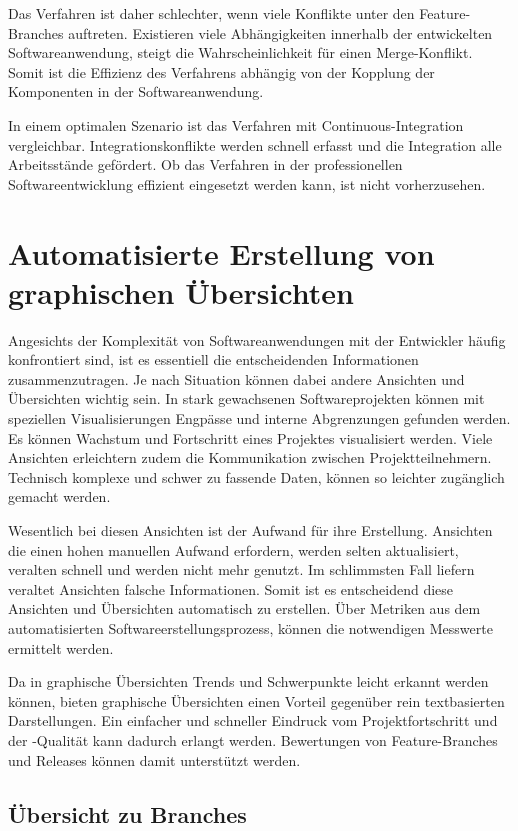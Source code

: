 Das Verfahren ist daher schlechter, wenn viele Konflikte unter den Feature-Branches auftreten. Existieren viele Abhängigkeiten innerhalb der entwickelten Softwareanwendung, steigt die Wahrscheinlichkeit für einen Merge-Konflikt. Somit ist die Effizienz des Verfahrens abhängig von der Kopplung der Komponenten in der Softwareanwendung.

In einem optimalen Szenario ist das Verfahren mit Continuous-Integration vergleichbar. Integrationskonflikte werden schnell erfasst und die Integration alle Arbeitsstände gefördert. Ob das Verfahren in der professionellen Softwareentwicklung effizient eingesetzt werden kann, ist nicht vorherzusehen.

\section{Automatisierte Erstellung von graphischen Übersichten}

Angesichts der Komplexität von Softwareanwendungen mit der Entwickler häufig konfrontiert sind, ist es essentiell die entscheidenden Informationen zusammenzutragen. Je nach Situation können dabei andere Ansichten und Übersichten wichtig sein. In stark gewachsenen Softwareprojekten können mit speziellen Visualisierungen Engpässe und interne Abgrenzungen gefunden werden. Es können Wachstum und Fortschritt eines Projektes visualisiert werden. Viele Ansichten erleichtern zudem die Kommunikation zwischen Projektteilnehmern. Technisch komplexe und schwer zu fassende Daten, können so leichter zugänglich gemacht werden.

Wesentlich bei diesen Ansichten ist der Aufwand für ihre Erstellung. Ansichten die einen hohen manuellen Aufwand erfordern, werden selten aktualisiert, veralten schnell und werden nicht mehr genutzt. Im schlimmsten Fall liefern veraltet Ansichten falsche Informationen. Somit ist es entscheidend diese Ansichten und Übersichten automatisch zu erstellen. Über Metriken aus dem automatisierten Softwareerstellungsprozess, können die notwendigen Messwerte ermittelt werden. 

Da in graphische Übersichten Trends und Schwerpunkte leicht erkannt werden können, bieten graphische Übersichten einen Vorteil gegenüber rein textbasierten Darstellungen. Ein einfacher und schneller Eindruck vom Projektfortschritt und der -Qualität kann dadurch erlangt werden. Bewertungen von Feature-Branches und Releases können damit unterstützt werden.

\subsection{Übersicht zu Branches}

